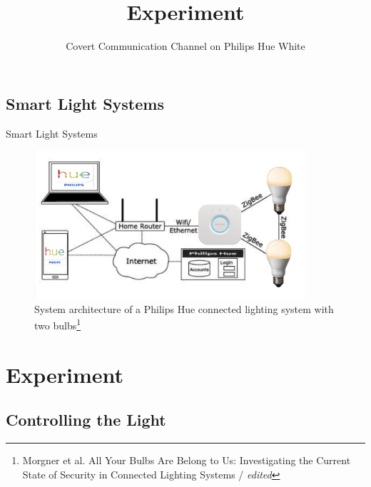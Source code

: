 \documentclass[11pt,t,usepdftitle=false,aspectratio=169]{beamer}
\begin{document}
\subsection{Smart Light Systems} %
\label{sub:smart_lights}
\begin{frame}{Smart Light Systems} %
  \begin{figure}
  	\centering
  	\includegraphics[height=5.5cm, keepaspectratio]{img/smart-light-system.png} 
  	\caption{\small{System architecture of a Philips Hue connected lighting system with two bulbs}\setcounter{footnote}{3}\footnote[frame]{\tiny{Morgner et al. All Your Bulbs Are Belong to Us: Investigating the Current State of Security in Connected Lighting Systems / \textit{edited}}}}
  \end{figure}
\end{frame}


\title{Experiment} 
\subtitle{Covert Communication Channel on Philips Hue White}
\section{Experiment}%
\label{sec:experiment}

\subsection{Controlling the Light} %
\label{sub:controlling_the_lights}
\end{document}
